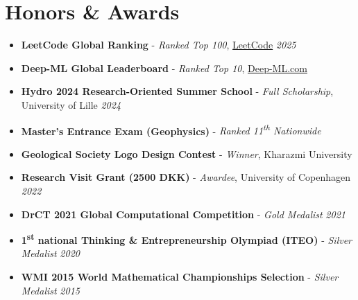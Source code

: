 \documentclass[letterpaper,11pt]{article}
\begin{document}
	\section{Honors \& Awards}
	\begin{itemize}[left=0pt, label={}, topsep=7.5pt,partopsep=0pt,itemsep=3.5pt,parsep=0pt]
		\item \textbf{LeetCode Global Ranking} - \textit{Ranked Top 100}, \href{https://leetcode.com/u/aradfarahani/}{LeetCode} \hfill \textit{2025}
		\item \textbf{Deep-ML Global Leaderboard} - \textit{Ranked Top 10}, \href{https://www.deep-ml.com/leaderboard}{Deep-ML.com} \hfill \textit{}
		\item \textbf{Hydro 2024 Research-Oriented Summer School} - \textit{Full Scholarship}, University of Lille \hfill \textit{2024}
		\item \textbf{Master's Entrance Exam (Geophysics)} - \textit{Ranked 11\textsuperscript{th} Nationwide} \hfill \textit{}
		\item \textbf{Geological Society Logo Design Contest} - \textit{Winner}, Kharazmi University \hfill \textit{}
		\item \textbf{Research Visit Grant (2500 DKK)} - \textit{Awardee}, University of Copenhagen \hfill \textit{2022}
		\item \textbf{DrCT 2021 Global Computational Competition} - \textit{Gold Medalist} \hfill \textit{2021}
		\item \textbf{1\textsuperscript{st} national Thinking \& Entrepreneurship Olympiad (ITEO)} - \textit{Silver Medalist} \hfill \textit{2020}
		\item \textbf{WMI 2015 World Mathematical Championships Selection} - \textit{Silver Medalist} \hfill \textit{2015}	
	\end{itemize}
\vspace{-1.0em}
	
	\vspace{-0.5em} 
\end{document}
